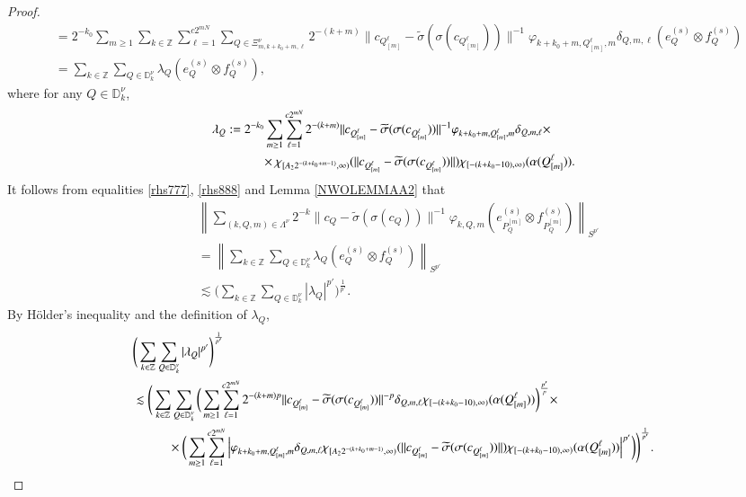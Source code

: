 \documentclass[12pt]{amsart}
\begin{document}
\begin{proof}
\begin{align}
&=2^{-k_0}\sum_{m\geq 1}\sum_{k\in\mathbb{Z}}\sum_{\ell=1}^{c2^{mN}}\sum_{Q\in \Xi_{m,k+k_0+m,\ell}^\nu}2^{-(k+m)}\|c_{Q_{[m]}^\ell}-\widetilde{\sigma}(\sigma(c_{Q_{[m]}^\ell}))\|^{-1}\varphi_{k+k_0+m,{Q_{[m]}^\ell},m}\delta_{Q,m,\ell} (e_Q^{(s)}\otimes f_Q^{(s)})\nonumber\\
&=\sum_{k\in\mathbb{Z}}\sum_{Q\in\mathbb{D}_k^\nu}\lambda_Q(e_Q^{(s)}\otimes f_Q^{(s)}),
\end{align}
where for any $Q\in \mathbb{D}_k^\nu$,
\begin{align*}
\lambda_Q&:=2^{-k_0}\sum_{m\geq 1}\sum_{\ell=1}^{c2^{mN}}2^{-(k+m)}\|c_{Q_{[m]}^\ell}-\widetilde{\sigma}(\sigma(c_{Q_{[m]}^\ell}))\|^{-1}\varphi_{k+k_0+m,{Q_{[m]}^\ell},m}\delta_{Q,m,\ell}\times\nonumber\\
&\hspace{1.0cm}\times\chi_{[A_22^{-(k+k_0+m-1)},\infty)}(\|c_{Q_{[m]}^\ell}-\widetilde{\sigma}(\sigma(c_{Q_{[m]}^\ell}))\|) \chi_{[-(k+k_0-10),\infty)}(\alpha(Q_{[m]}^\ell)).
\end{align*}
It follows from equalities \eqref{rhs777}, \eqref{rhs888} and Lemma \ref{NWOLEMMAA2} that
\begin{align}\label{rhs999}
&\left\|\sum_{(k,Q,m)\in\Lambda^\nu}2^{-k}\|c_Q-\widetilde{\sigma}(\sigma(c_Q))\|^{-1}\varphi_{k,Q,m} (e_{P_Q^{[m]}}^{(s)}\otimes f_{P_Q^{[m]}}^{(s)})\right\|_{S^{p'}}\nonumber\\
&=\left\|\sum_{k\in\mathbb{Z}}\sum_{Q\in\mathbb{D}_k^\nu}\lambda_Q(e_Q^{(s)}\otimes f_Q^{(s)})\right\|_{S^{p'}}\nonumber\\
&\lesssim \Bigg(\sum_{k\in\mathbb{Z}}\sum_{Q\in\mathbb{D}_k^\nu}|\lambda_Q|^{p'}\Bigg)^{\frac{1}{p'}}.
\end{align}
By H\"{o}lder's inequality and the definition of $\lambda_Q$,
\begin{align*}
&\Bigg(\sum_{k\in\mathbb{Z}}\sum_{Q\in\mathbb{D}_k^\nu}|\lambda_Q|^{p'}\Bigg)^{\frac{1}{p'}}\nonumber\\
&\lesssim \Bigg(\sum_{k\in\mathbb{Z}}\sum_{Q\in\mathbb{D}_k^\nu} \bigg(\sum_{m\geq 1}\sum_{\ell=1}^{c2^{mN}}2^{-(k+m)p}\|c_{Q_{[m]}^\ell}-\widetilde{\sigma}(\sigma(c_{Q_{[m]}^\ell}))\|^{-p}\delta_{Q,m,\ell}\chi_{[-(k+k_0-10),\infty)}(\alpha(Q_{[m]}^\ell))\bigg)^{\frac{p'}{p}}\times\nonumber\\
&\hspace{1.0cm}\times \bigg(\sum_{m\geq 1}\sum_{\ell=1}^{c2^{mN}}\Big|\varphi_{k+k_0+m,{Q_{[m]}^\ell},m}\delta_{Q,m,\ell}\chi_{[A_22^{-(k+k_0+m-1)},\infty)}(\|c_{Q_{[m]}^\ell}-\widetilde{\sigma}(\sigma(c_{Q_{[m]}^\ell}))\|) \chi_{[-(k+k_0-10),\infty)}(\alpha(Q_{[m]}^\ell))\Big|^{p'}\bigg)    \Bigg)^{\frac{1}{p'}}.

\end{align*}
\end{proof}
\end{document}
